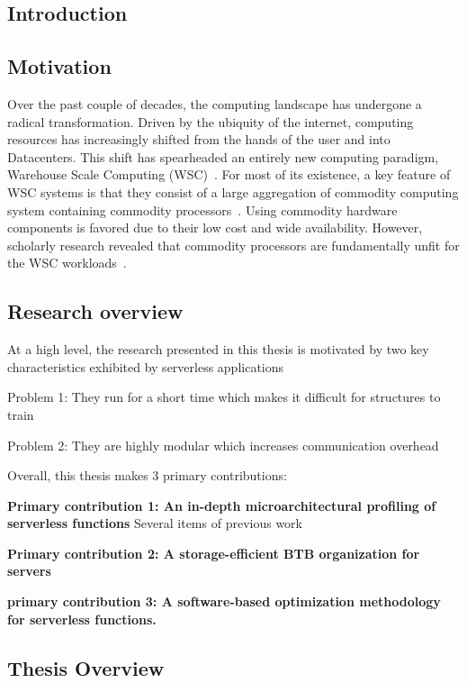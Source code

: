 \documentclass[../main.tex]{subfiles}
\begin{document}
\ifx\chapincluded\undefined
  \begin{refsection}
 \fi


\chapter{Introduction}

\section{Motivation}
Over the past couple of decades, the computing landscape has undergone a radical transformation. Driven by the ubiquity of the internet, computing resources has increasingly shifted from the hands of the user and into Datacenters. This shift has spearheaded an entirely new computing paradigm, Warehouse Scale Computing (WSC)~\cite{barroso18_datac_as_comput}. For most of its existence, a key feature of WSC systems is that they consist of a large aggregation of commodity computing system containing commodity processors~\cite{barroso03_web_searc_planet}. Using commodity hardware components is favored due to their low cost and wide availability. However, scholarly research revealed that commodity processors are fundamentally unfit for the WSC workloads~\cite{ ferdman12_clear_cloud,kanev15_profil}.


\section{Research overview}

At a high level, the research presented in this thesis is motivated by two key characteristics exhibited by serverless applications

Problem 1: They run for a short time which makes it difficult for structures to train

Problem 2: They are highly modular which increases communication overhead

Overall, this thesis makes 3 primary contributions:

\vspace*{0.5cm}

\noindent
\textbf{Primary contribution 1: An in-depth microarchitectural profiling of serverless functions}
Several items of previous work 

\vspace*{0.5cm}

\noindent
\textbf{Primary contribution 2: A storage-efficient BTB organization for servers}

\vspace*{0.5cm}

\noindent
\textbf{primary contribution 3: A software-based optimization methodology for serverless functions.}

\section{Thesis Overview}


\ifx\chapincluded\undefined
  \printbibliography
  \end{refsection}
 \fi
\end{document}
